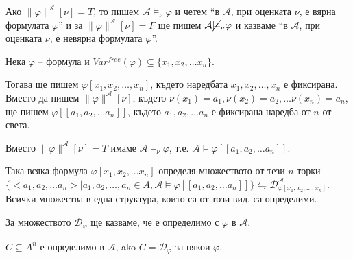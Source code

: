 \documentclass{article}
\begin{document}
\begin{mydef}
\begin{remark}
Ако $\|\varphi\|^\mathcal{A}[\nu] = T$, то пишем $\mathcal{A} \models_\nu \varphi$ и четем ``в $\mathcal{A}$, при оценката $\nu$, е вярна формулата $\varphi$'' и за $\|\varphi\|^\mathcal{A}[\nu] = F$ ще пишем $\mathcal{A} \cancel{\models}_\nu \varphi$ и казваме ``в $\mathcal{A}$, при оценката $\nu$, е невярна формулата $\varphi$''.
\end{remark}

\end{mydef}

\begin{mydef}
Нека $\varphi$ -- формула и $Var^{free}(\varphi) \subseteq \{x_1, x_2, \ldots x_n\}$. 

Тогава ще пишем $\varphi[x_1, x_2, \ldots, x_n]$, където наредбата $x_1, x_2, \ldots, x_n$ е фиксирана. Вместо да пишем $\|\varphi\|^\mathcal{A}[\nu]$, където $\nu(x_1) = a_1, \nu(x_2) = a_2, \ldots \nu(x_n) = a_n$, ще пишем $\varphi[\![a_1, a_2, \ldots a_n]\!]$, където $a_1, a_2, \ldots a_n$ е фиксирана наредба от $n$ от света.

Вместо $\|\varphi\|^\mathcal{A}[\nu] = T$ имаме $\mathcal{A} \models_\nu \varphi$, т.е. $\mathcal{A} \models \varphi[\![a_1, a_2, \ldots a_n]\!]$.

Така всяка формула $\varphi[x_1, x_2, \ldots x_n]$ определя множеството от тези $n$-торки $\{<a_1, a_2, \ldots a_n> | a_1, a_2,\ldots, a_n \in A, \mathcal{A} \models \varphi[\![a_1, a_2, \ldots a_n]\!]\} \leftrightharpoons \mathcal{D}^\mathcal{A}_{\varphi[x_1, x_2, \ldots, x_n]}$. Всички множества в една структура, които са от този вид, са определими.

За множеството $\mathcal{D}_\varphi$ ще казваме, че е определимо с $\varphi$ в $\mathcal{A}$.

$C \subseteq A^n$ е определимо в $\mathcal{A}$, ako $C = \mathcal{D}_\varphi$ за някои $\varphi$.
\end{mydef}
\end{document}

